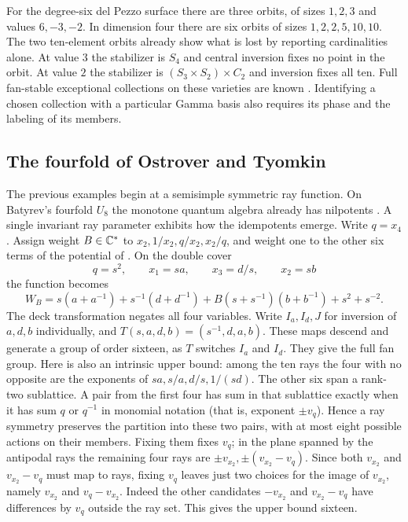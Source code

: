 For the degree-six del Pezzo surface there are three orbits, of sizes $1,2,3$ and values $6,-3,-2$. In dimension four there are six orbits of sizes $1,2,2,5,10,10$. The two ten-element orbits already show what is lost by reporting cardinalities alone. At value $3$ the stabilizer is $S_4$ and central inversion fixes no point in the orbit. At value $2$ the stabilizer is $(S_3\times S_2)\times C_2$ and inversion fixes all ten. Full fan-stable exceptional collections on these varieties are known \cite[\S4D]{BDM}. Identifying a chosen collection with a particular Gamma basis also requires its phase and the labeling of its members.

\subsection{The fourfold of Ostrover and Tyomkin}
The previous examples begin at a semisimple symmetric ray function. On Batyrev's fourfold $U_8$ the monotone quantum algebra already has nilpotents \cite[Proposition~B and \S5]{OT}. A single invariant ray parameter exhibits how the idempotents emerge. Write $q=x_4$. Assign weight $B\in\mathbb C^*$ to $x_2,1/x_2,q/x_2,x_2/q$, and weight one to the other six terms of the potential of \cite[\S5]{OT}. On the double cover
\[
 q=s^2,\qquad x_1=sa,\qquad x_3=d/s,\qquad x_2=sb
\]
the function becomes
\[
 W_B=s(a+a^{-1})+s^{-1}(d+d^{-1})
         +B(s+s^{-1})(b+b^{-1})+s^2+s^{-2}.
\]
The deck transformation negates all four variables. Write $I_a,I_d,J$ for inversion of $a,d,b$ individually, and $T(s,a,d,b)=(s^{-1},d,a,b)$. These maps descend and generate a group of order sixteen, as $T$ switches $I_a$ and $I_d$. They give the full fan group. Here is also an intrinsic upper bound: among the ten rays the four with no opposite are the exponents of $sa,s/a,d/s,1/(sd)$. The other six span a rank-two sublattice. A pair from the first four has sum in that sublattice exactly when it has sum $q$ or $q^{-1}$ in monomial notation (that is, exponent $\pm v_q$). Hence a ray symmetry preserves the partition into these two pairs, with at most eight possible actions on their members. Fixing them fixes $v_q$; in the plane spanned by the antipodal rays the remaining four rays are $\pm v_{x_2},\pm(v_{x_2}-v_q)$. Since both $v_{x_2}$ and $v_{x_2}-v_q$ must map to rays, fixing $v_q$ leaves just two choices for the image of $v_{x_2}$, namely $v_{x_2}$ and $v_q-v_{x_2}$. Indeed the other candidates $-v_{x_2}$ and $v_{x_2}-v_q$ have differences by $v_q$ outside the ray set. This gives the upper bound sixteen.

